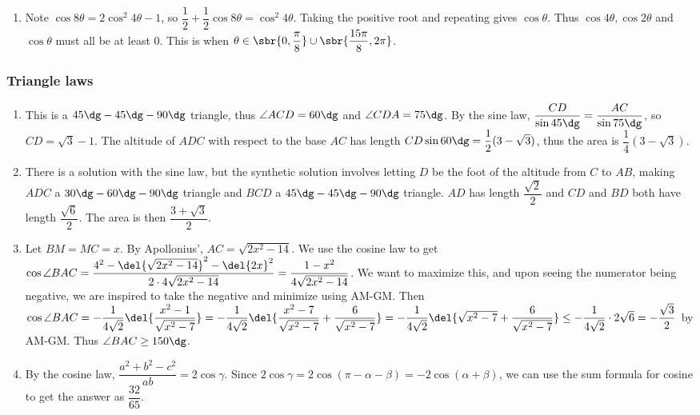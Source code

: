 \documentclass[10pt,paper=letter]{scrartcl}
\begin{document}
\begin{enumerate}
\item Note $\cos 8\theta = 2\cos^2 4\theta - 1$, so $\dfrac{1}{2} + \dfrac{1}{2}\cos 8\theta = \cos^2 4\theta$. Taking the positive root and repeating gives $\cos \theta$. Thus $\cos 4\theta, \cos 2\theta$ and $\cos \theta$ must all be at least $0$. This is when $\theta \in \sbr{0, \dfrac\pi8} \cup \sbr{\dfrac{15\pi}8, 2\pi}$.

\end{enumerate}

\subsubsection*{Triangle laws}

\begin{enumerate}

\item This is a $45\dg-45\dg-90\dg$ triangle, thus $\angle ACD = 60\dg$ and $\angle CDA = 75\dg$. By the sine law, $\dfrac{CD}{\sin 45\dg} = \dfrac{AC}{\sin 75\dg}$, so $CD = \sqrt{3} - 1$. The altitude of $ADC$ with respect to the base $AC$ has length $CD\sin 60\dg = \dfrac{1}{2}(3 - \sqrt{3})$, thus the area is $\dfrac{1}{4}(3 - \sqrt{3})$.

\item There is a solution with the sine law, but the synthetic solution involves letting $D$ be the foot of the altitude from $C$ to $AB$, making $ADC$ a $30\dg-60\dg-90\dg$ triangle and $BCD$ a $45\dg-45\dg-90\dg$ triangle. $AD$ has length $\dfrac{\sqrt{2}}{2}$ and $CD$ and $BD$ both have length $\dfrac{\sqrt{6}}{2}$. The area is then $\dfrac{3 + \sqrt{3}}{2}$.

\item Let $BM = MC = x$. By Apollonius', $AC = \sqrt{2x^2 - 14}$. We use the cosine law to get $\cos \angle BAC = \dfrac{4^2 - \del{\sqrt{2x^2 - 14}}^2 - \del{2x}^2}{2\cdot4\sqrt{2x^2-14}} = \dfrac{1 - x^2}{4\sqrt{2x^2-14}}$. We want to maximize this, and upon seeing the numerator being negative, we are inspired to take the negative and minimize using AM-GM. Then $\cos \angle BAC = -\dfrac1{4\sqrt2}\del{\dfrac{x^2 - 1}{\sqrt{x^2 - 7}}} = -\dfrac1{4\sqrt2}\del{\dfrac{x^2 - 7}{\sqrt{x^2 - 7}} + \dfrac6{\sqrt{x^2-7}}} = -\dfrac1{4\sqrt2}\del{\sqrt{x^2 - 7} + \dfrac6{\sqrt{x^2-7}}} \leq -\dfrac1{4\sqrt2}\cdot 2\sqrt6 = -\dfrac{\sqrt3}2$ by AM-GM. Thus $\angle BAC \geq 150\dg$.

\item By the cosine law, $\dfrac{a^2 + b^2 - c^2}{ab} = 2\cos \gamma$. Since $2\cos \gamma = 2\cos(\pi - \alpha - \beta) = -2\cos(\alpha + \beta)$, we can use the sum formula for cosine to get the answer as $\dfrac{32}{65}$.


\end{enumerate}
\end{document}
